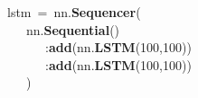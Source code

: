 \noindent
\mbox{}lstm\ =\ nn.\textbf{Sequencer}( \\
\mbox{}\ \ \ nn.\textbf{Sequential}() \\
\mbox{}\ \ \ \ \ \ :\textbf{add}(nn.\textbf{LSTM}(100,100)) \\
\mbox{}\ \ \ \ \ \ :\textbf{add}(nn.\textbf{LSTM}(100,100)) \\
\mbox{}\ \ \ )
